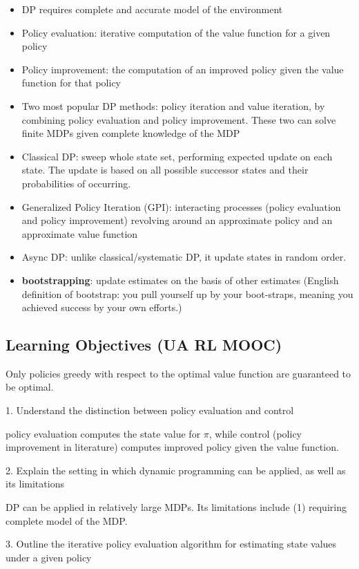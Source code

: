 \documentclass[sutton_barto_notes.tex]{subfiles}
\begin{document}
\begin{itemize}
\item DP requires complete and accurate model of the environment
\item Policy evaluation: iterative computation of the value function for a given policy
\item Policy improvement: the computation of an improved policy given the value function for that policy
\item Two most popular DP methods: policy iteration and value iteration, by combining policy evaluation and policy improvement. These two can solve finite MDPs given complete knowledge of the MDP
\item Classical DP: sweep whole state set, performing expected update on each state. The update is based on all possible successor states and their probabilities of occurring.
\item Generalized Policy Iteration (GPI): interacting processes (policy evaluation and policy improvement) revolving around an approximate policy and an approximate value function
\item Async DP: unlike classical/systematic DP, it update states in random order.
\item \textbf{bootstrapping}: update estimates on the basis of other estimates (English definition of bootstrap: you pull yourself up by your boot-straps, meaning you achieved success by your own efforts.)
\end{itemize}

\newpage
\subsection{Learning Objectives (UA RL MOOC)}

Only policies greedy with respect to the optimal value function are guaranteed to be optimal.

1. Understand the distinction between policy evaluation and control

policy evaluation computes the state value for $\pi$, while control (policy improvement in literature) computes improved policy given the value function.

2. Explain the setting in which dynamic programming can be applied, as well as its limitations

DP can be applied in relatively large MDPs. Its limitations include (1) requiring complete model of the MDP.

3. Outline the iterative policy evaluation algorithm for estimating state values under a given policy
\end{document}
